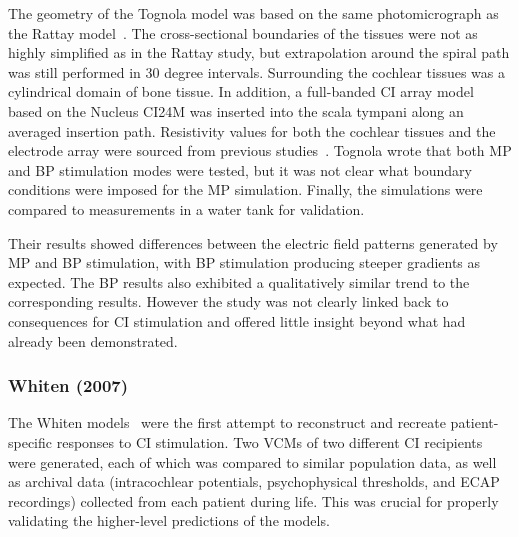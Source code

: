 The geometry of the Tognola model was based on the same photomicrograph as the
Rattay model~\cite{rattay2001model}. The cross-sectional boundaries of the
tissues were not as highly simplified as in the Rattay study, but extrapolation
around the spiral path was still performed in 30 degree intervals. Surrounding
the cochlear tissues was a cylindrical domain of bone tissue. In addition, a
full-banded CI array model based on the Nucleus CI24M was inserted into the
scala tympani along an averaged insertion path. Resistivity values for both the
cochlear tissues and the electrode array were sourced from previous
studies~\cite{strelioff1973,finley1990,suesserman1993,gabriel1996b}. Tognola
\etal{} wrote that both MP and BP stimulation modes were tested, but it was not
clear what boundary conditions were imposed for the MP simulation. Finally, the
simulations were compared to measurements in a water tank for validation.

Their results showed differences between the electric field patterns generated
by MP and BP stimulation, with BP stimulation producing steeper gradients as
expected. The \insilico{} BP results also exhibited a qualitatively similar
trend to the corresponding \invitro{} results. However the study was not clearly
linked back to consequences for CI stimulation and offered little insight beyond
what had already been demonstrated.

\subsubsection{Whiten (2007)}
\label{sect:whiten}

The Whiten models~\cite{whiten2007} were the first attempt to reconstruct and
recreate patient-specific responses to CI stimulation. Two VCMs of two different
CI recipients were generated, each of which was compared to similar population
data, as well as archival data (intracochlear potentials, psychophysical
thresholds, and ECAP recordings) collected from each patient during life. This
was crucial for properly validating the higher-level \insilico{} predictions of
the models.

